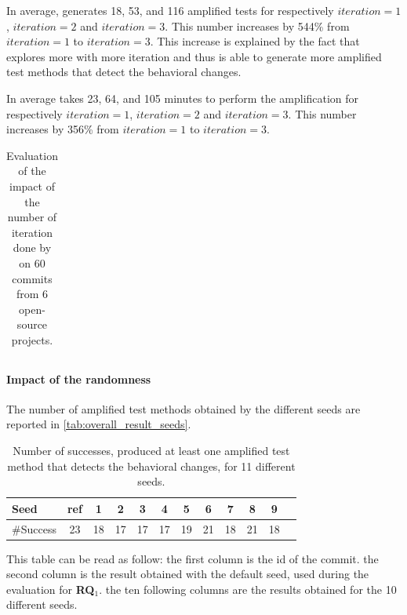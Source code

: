 In average, \DCII generates 18, 53, and 116 amplified tests for respectively $iteration=1$, $iteration=2$ and $iteration=3$. 
This number increases by 544\% from $iteration=1$ to $iteration=3$.
This increase is explained by the fact that \DCII explores more with more iteration and thus is able to generate more amplified test methods that detect the behavioral changes.

In average \DCII takes 23, 64, and 105 minutes to perform the amplification for respectively $iteration=1$, $iteration=2$ and $iteration=3$.
This number increases by 356\% from $iteration=1$ to $iteration=3$.

\begin{table}
\small
\def\arraystretch{0.05}%
\setlength\tabcolsep{6pt} %
\caption{Evaluation of the impact of the number of iteration done by \DCII on 60 commits from 6 open-source projects.}
\label{tab:overall_result_iteration}
\begin{tabular}{l|c|cc|cc|cc}
\toprule

\end{tabular}
\end{table}

\paragraph{Impact of the randomness}

The number of amplified test methods obtained by the different seeds are reported in \autoref{tab:overall_result_seeds}.

\begin{table}
	\small
	\caption{Number of successes, \ie \DCI produced at least one amplified test method that detects the behavioral changes, for 11 different seeds.}
	\centering
	\label{tab:overall_result_seeds}
	\begin{tabular}{l|ccccccccccc}
		\toprule
		Seed	&	ref	&	1	&	2	&	3	&	4	&	5	&	6	&	7	&	8	&	9\\
		\midrule
		\#Success	&	23	&	18	&	17	&	17	&	17	&	19	&	21	&	18	&	21	&	18\\
		\bottomrule
	\end{tabular}
\end{table}

This table can be read as follow:
the first column is the id of the commit.
the second column is the result obtained with the default seed, used during the evaluation for \textbf{RQ$_1$}.
the ten following columns are the results obtained for the 10 different seeds.

